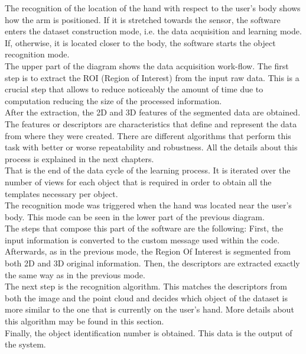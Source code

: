 The recognition of the location of the hand with respect to the user's body shows how the arm is positioned. If it is stretched towards the sensor, the software enters the dataset construction mode, i.e. the data acquisition and learning mode. If, otherwise, it is located closer to the body, the software starts the object recognition mode. 
\\


The upper part of the diagram shows the data acquisition work-flow. The first step is to extract the ROI (Region of Interest) from the input raw data. This is a crucial step that allows to reduce noticeably the amount of time due to computation reducing the size of the processed information. 
\\

After the extraction, the 2D and 3D features of the segmented data are obtained. The features or descriptors are characteristics that define and represent the data from where they were created. There are different algorithms that perform this task with better or worse repeatability and robustness. All the details about this process is explained in the next chapters. 
\\

That is the end of the data cycle of the learning process. It is iterated over the number of views for each object that is required in order to obtain all the templates necessary per object. 
\\

The recognition mode was triggered when the hand was located near the user's body. This mode can be seen in the lower part of the previous diagram. 
\\

The steps that compose this part of the software are the following: 
First, the input information is converted to the custom message used within the code. Afterwards, as in the previous mode, the Region Of Interest is segmented from both 2D and 3D original information. Then, the descriptors are extracted exactly the same way as in the previous mode. 
\\

The next step is the recognition algorithm. This matches the descriptors from both the image and the point cloud and decides which object of the dataset is more similar to the one that is currently on the user's hand. More details about this algorithm may be found in this section. 
\\

Finally, the object identification number is obtained. This data is the output of the system. 
